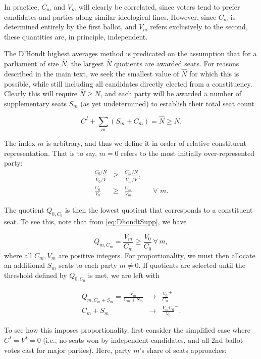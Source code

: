 In practice, $C_m$ and $V_m$ will clearly be correlated, since voters tend to prefer candidates and parties along similar ideological lines. However, since $C_m$ is determined entirely by the first ballot, and $V_m$ refers exclusively to the second, these quantities are, in principle, independent.

The D'Hondt highest averages method is predicated on the assumption that for a parliament of size $\hat{N}$, the largest $\hat{N}$ quotients are awarded seats.
For reasons described in the main text, we seek the smallest value of $\hat{N}$ for which this is possible, while still including all candidates directly elected from a constituency.
Clearly this will require $\hat{N}\ge N$, and each party will be awarded a number of supplementary seats $S_m$ (as yet undetermined) to establish their total seat count

\begin{equation}
\label{eq:sum_Sm}
C^I + \sum_m\left( S_m +C_m\right) = \hat{N} \ge N.
\end{equation}

The index $m$ is arbitrary, and thus we define it in order of relative constituent representation. That is to say, $m=0$ refers to the most initially over-represented party:
\begin{align}
\label{eq:most_overrep}
\frac{C_0/N}{V_0/\hat{V}} &\ge& \frac{C_m/N}{V_m/\hat{V}}, \\
\frac{C_0}{V_0} &\ge& \frac{C_m}{V_m} && \forall \,\, m.
\end{align}

The quotient $Q_{0,C_0}$ is then the lowest quotient that corresponds to a constituent seat. To see this, note that from \ref{eq:DhondtSupp}, we have

\begin{equation}
\label{eq:QmCm}
Q_{m,C_m} = \frac{V_m}{C_m} \ge \frac{V_0}{C_0} \,  \forall \, m,
\end{equation}
where all $C_m,V_m$ are positive integers. For proportionality, we must then allocate an additional $S_m$ seats to each party $m \neq 0$. If quotients are selected until the  threshold defined by $Q_{0,C_0}$ is met, we are left with

\begin{align}
\label{eq:QmSm}
Q_{m,C_m+S_m} = \frac{V_m}{C_m+S_m} &\to& \frac{V_0}{C_0}^+ \\
{C_m+S_m} &\to& \frac{V_mC_0}{V_0}^-.
\end{align}

To see how this imposes proportionality, first consider the simplified case where $C^I=V^I=0$ (i.e., no seats won by independent candidates, and all 2nd ballot votes cast for major parties). Here, party $m$'s share of seats approaches:

